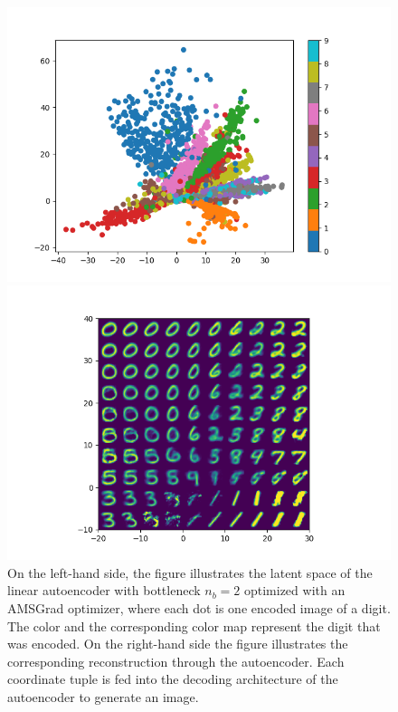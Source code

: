 \begin{figure}
\begin{center}
   \begin{minipage}[b]{0.49\linewidth}
      \includegraphics[trim = 15mm 5mm 15mm 10mm, clip, width=\linewidth]{linear_AE_2d_amsgrad_latent}
	\end{minipage}
	\begin{minipage}[b]{0.49\linewidth}
      \includegraphics[trim = 15mm 5mm 15mm 10mm, clip, width=\linewidth]{linear_AE_2d_amsgrad_reconstruction}
	\end{minipage}
\end{center}
\caption{On the left-hand side, the figure illustrates the latent space of the linear autoencoder with bottleneck $n_b=2$ optimized with an AMSGrad optimizer, where each dot is one encoded image of a digit. The color and the corresponding color map represent the digit that was encoded. On the right-hand side the figure illustrates the corresponding reconstruction through the autoencoder. Each coordinate tuple is fed into the decoding architecture of the autoencoder to generate an image.}\label{fig:linear_AE_2d_amsgrad_latent}
\end{figure}



